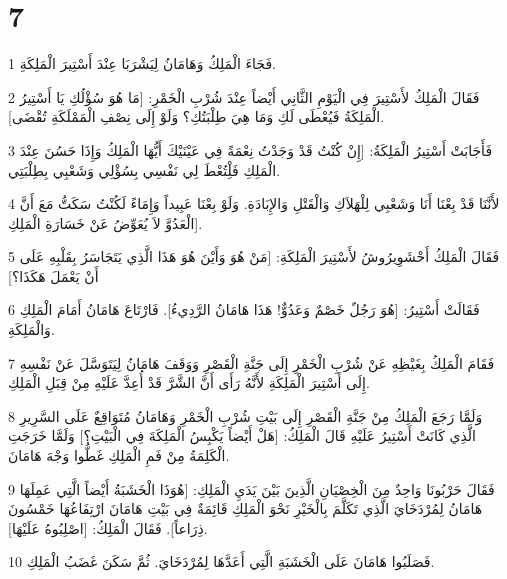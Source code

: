 \chapter{7}

\par 1 فَجَاءَ الْمَلِكُ وَهَامَانُ لِيَشْرَبَا عِنْدَ أَسْتِيرَ الْمَلِكَةِ.
\par 2 فَقَالَ الْمَلِكُ لأَسْتِيرَ فِي الْيَوْمِ الثَّانِي أَيْضاً عِنْدَ شُرْبِ الْخَمْرِ: [مَا هُوَ سُؤْلُكِ يَا أَسْتِيرُ الْمَلِكَةُ فَيُعْطَى لَكِ وَمَا هِيَ طِلْبَتُكِ؟ وَلَوْ إِلَى نِصْفِ الْمَمْلَكَةِ تُقْضَى].
\par 3 فَأَجَابَتْ أَسْتِيرُ الْمَلِكَةُ: [إِنْ كُنْتُ قَدْ وَجَدْتُ نِعْمَةً فِي عَيْنَيْكَ أَيُّهَا الْمَلِكُ وَإِذَا حَسُنَ عِنْدَ الْمَلِكِ فَلِْتُعْطَ لِي نَفْسِي بِسُؤْلِي وَشَعْبِي بِطِلْبَتِي.
\par 4 لأَنَّنَا قَدْ بِعْنَا أَنَا وَشَعْبِي لِلْهَلاَكِ وَالْقَتْلِ وَالإِبَادَةِ. وَلَوْ بِعْنَا عَبِيداً وَإِمَاءً لَكُنْتُ سَكَتُّ مَعَ أَنَّ الْعَدُوَّ لاَ يُعَوِّضُ عَنْ خَسَارَةِ الْمَلِكِ].
\par 5 فَقَالَ الْمَلِكُ أَحْشَوِيرُوشُ لأَسْتِيرَ الْمَلِكَةِ: [مَنْ هُوَ وَأَيْنَ هُوَ هَذَا الَّذِي يَتَجَاسَرُ بِقَلْبِهِ عَلَى أَنْ يَعْمَلَ هَكَذَا؟]
\par 6 فَقَالَتْ أَسْتِيرُ: [هُوَ رَجُلٌ خَصْمٌ وَعَدُوٌّ! هَذَا هَامَانُ الرَّدِيءُ]. فَارْتَاعَ هَامَانُ أَمَامَ الْمَلِكِ وَالْمَلِكَةِ.
\par 7 فَقَامَ الْمَلِكُ بِغَيْظِهِ عَنْ شُرْبِ الْخَمْرِ إِلَى جَنَّةِ الْقَصْرِ وَوَقَفَ هَامَانُ لِيَتَوَسَّلَ عَنْ نَفْسِهِ إِلَى أَسْتِيرَ الْمَلِكَةِ لأَنَّهُ رَأَى أَنَّ الشَّرَّ قَدْ أُعِدَّ عَلَيْهِ مِنْ قِبَلِ الْمَلِكِ.
\par 8 وَلَمَّا رَجَعَ الْمَلِكُ مِنْ جَنَّةِ الْقَصْرِ إِلَى بَيْتِ شُرْبِ الْخَمْرِ وَهَامَانُ مُتَوَاقِعٌ عَلَى السَّرِيرِ الَّذِي كَانَتْ أَسْتِيرُ عَلَيْهِ قَالَ الْمَلِكُ: [هَلْ أَيْضاً يَكْبِسُ الْمَلِكَةَ فِي الْبَيْتِ؟] وَلَمَّا خَرَجَتِ الْكَلِمَةُ مِنْ فَمِ الْمَلِكِ غَطُّوا وَجْهَ هَامَانَ.
\par 9 فَقَالَ حَرْبُونَا وَاحِدٌ مِنَ الْخِصْيَانِ الَّذِينَ بَيْنَ يَدَيِ الْمَلِكِ: [هُوَذَا الْخَشَبَةُ أَيْضاً الَّتِي عَمِلَهَا هَامَانُ لِمُرْدَخَايَ الَّذِي تَكَلَّمَ بِالْخَيْرِ نَحْوَ الْمَلِكِ قَائِمَةٌ فِي بَيْتِ هَامَانَ ارْتِفَاعُهَا خَمْسُونَ ذِرَاعاً]. فَقَالَ الْمَلِكُ: [اصْلِبُوهُ عَلَيْهَا].
\par 10 فَصَلَبُوا هَامَانَ عَلَى الْخَشَبَةِ الَّتِي أَعَدَّهَا لِمُرْدَخَايَ. ثُمَّ سَكَنَ غَضَبُ الْمَلِكِ.

